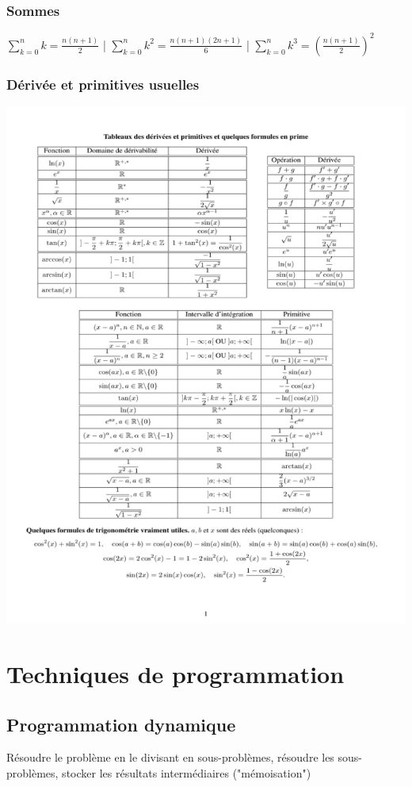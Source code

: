 \documentclass[8pt]{article}
\begin{document}
                \subsubsection{Sommes}
                $\sum_{k=0}^{n} k = \frac{n(n+1)}{2}$ | $\sum_{k=0}^{n} k^2 = \frac{n(n+1)(2n+1)}{6}$
                | $\sum_{k=0}^{n} k^3 = \left(\frac{n(n+1)}{2}\right)^2$
                \subsubsection{Dérivée et primitives usuelles}
                    \includegraphics[scale=0.75]{../image/tableau.png}
    \section{Techniques de programmation}
        \subsection{Programmation dynamique}
        Résoudre le problème en le divisant en sous-problèmes, résoudre les sous-problèmes, stocker les résultats
        intermédiaires ("mémoisation")
\end{document}
